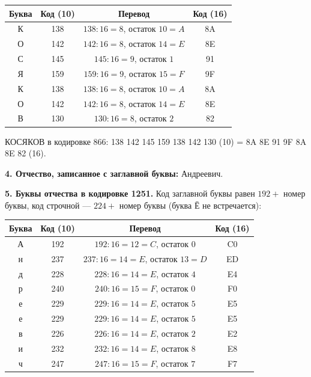 \documentclass[a4paper, 12pt]{article}
\begin{document}
\begin{center}
\begin{tabular}{|c|c|c|c|}
\hline
Буква & Код (10) & Перевод & Код (16) \\ \hline
К & 138 & $138 : 16 = 8$, остаток $10 = A$ & 8A \\ \hline
О & 142 & $142 : 16 = 8$, остаток $14 = E$ & 8E \\ \hline
С & 145 & $145 : 16 = 9$, остаток $1$ & 91 \\ \hline
Я & 159 & $159 : 16 = 9$, остаток $15 = F$ & 9F \\ \hline
К & 138 & $138 : 16 = 8$, остаток $10 = A$ & 8A \\ \hline
О & 142 & $142 : 16 = 8$, остаток $14 = E$ & 8E \\ \hline
В & 130 & $130 : 16 = 8$, остаток $2$ & 82 \\ \hline
\end{tabular}
\end{center}

КОСЯКОВ в кодировке 866: 138 142 145 159 138 142 130 (10) = 8A 8E 91 9F 8A 8E 82 (16).

\textbf{4. Отчество, записанное с заглавной буквы:} Андреевич.

\textbf{5. Буквы отчества в кодировке 1251.} Код заглавной буквы равен $192 + $ номер буквы,
код строчной --- $224 + $ номер буквы (буква Ё не встречается):

\begin{center}
\begin{tabular}{|c|c|c|c|}
\hline
Буква & Код (10) & Перевод & Код (16) \\ \hline
А & 192 & $192 : 16 = 12 = C$, остаток $0$ & C0 \\ \hline
н & 237 & $237 : 16 = 14 = E$, остаток $13 = D$ & ED \\ \hline
д & 228 & $228 : 16 = 14 = E$, остаток $4$ & E4 \\ \hline
р & 240 & $240 : 16 = 15 = F$, остаток $0$ & F0 \\ \hline
е & 229 & $229 : 16 = 14 = E$, остаток $5$ & E5 \\ \hline
е & 229 & $229 : 16 = 14 = E$, остаток $5$ & E5 \\ \hline
в & 226 & $226 : 16 = 14 = E$, остаток $2$ & E2 \\ \hline
и & 232 & $232 : 16 = 14 = E$, остаток $8$ & E8 \\ \hline
ч & 247 & $247 : 16 = 15 = F$, остаток $7$ & F7 \\ \hline
\end{tabular}
\end{center}
\end{document}
